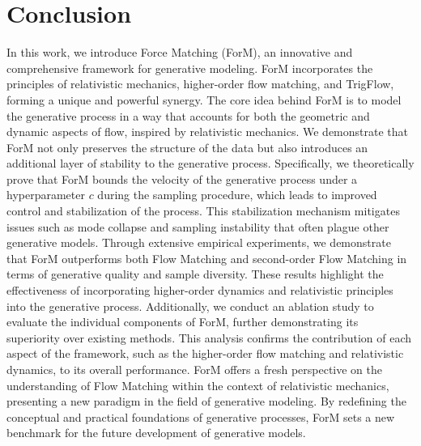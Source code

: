 \section{Conclusion} \label{sec:conclusion}

In this work, we introduce Force Matching (ForM), an innovative and comprehensive framework for generative modeling. ForM incorporates the principles of relativistic mechanics, higher-order flow matching, and TrigFlow, forming a unique and powerful synergy. The core idea behind ForM is to model the generative process in a way that accounts for both the geometric and dynamic aspects of flow, inspired by relativistic mechanics. We demonstrate that ForM not only preserves the structure of the data but also introduces an additional layer of stability to the generative process. Specifically, we theoretically prove that ForM bounds the velocity of the generative process under a hyperparameter $c$ during the sampling procedure, which leads to improved control and stabilization of the process. This stabilization mechanism mitigates issues such as mode collapse and sampling instability that often plague other generative models. 
Through extensive empirical experiments, we demonstrate that ForM outperforms both Flow Matching and second-order Flow Matching in terms of generative quality and sample diversity. These results highlight the effectiveness of incorporating higher-order dynamics and relativistic principles into the generative process. 
Additionally, we conduct an ablation study to evaluate the individual components of ForM, further demonstrating its superiority over existing methods. 
This analysis confirms the contribution of each aspect of the framework, such as the higher-order flow matching and relativistic dynamics, to its overall performance. 
ForM offers a fresh perspective on the understanding of Flow Matching within the context of relativistic mechanics, presenting a new paradigm in the field of generative modeling. 
By redefining the conceptual and practical foundations of generative processes, ForM sets a new benchmark for the future development of generative models.
